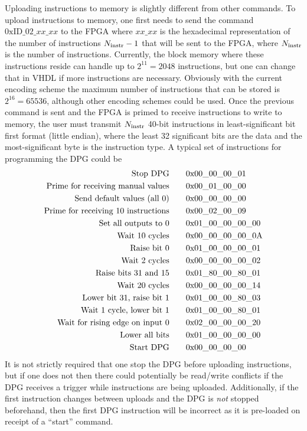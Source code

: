 \documentclass[]{article}
\begin{document}
Uploading instructions to memory is slightly different from other commands.  To upload instructions to memory, one first needs to send the command $0\mathrm{xID}\_02\_xx\_xx$ to the FPGA where $xx\_xx$ is the hexadecimal representation of the number of instructions $N_{\rm instr}-1$ that will be sent to the FPGA, where $N_{\rm instr}$ is the number of instructions.  Currently, the block memory where these instructions reside can handle up to $2^11=2048$ instructions, but one can change that in VHDL if more instructions are necessary.  Obviously with the current encoding scheme the maximum number of instructions that can be stored is $2^{16}=65536$, although other encoding schemes could be used.  Once the previous command is sent and the FPGA is primed to receive instructions to write to memory, the user must transmit $N_{\rm instr}$ 40-bit instructions in least-significant bit first format (little endian), where the least 32 significant bits are the data and the most-significant byte is the instruction type.  A typical set of instructions for programming the DPG could be
\begin{align}
\textrm{Stop DPG}\quad\quad&0\mathrm{x}00\_00\_00\_01\notag\\
\textrm{Prime for receiving manual values}\quad\quad&0\mathrm{x}00\_01\_00\_00\notag\\
\textrm{Send default values (all 0)}\quad\quad&0\mathrm{x}00\_00\_00\_00\notag\\
\textrm{Prime for receiving 10 instructions}\quad\quad&0\mathrm{x}00\_02\_00\_09\notag\\
\textrm{Set all outputs to 0}\quad\quad&0\mathrm{x}01\_00\_00\_00\_00\notag\\
\textrm{Wait 10 cycles}\quad\quad&0\mathrm{x}00\_00\_00\_00\_0\mathrm{A}\notag\\
\textrm{Raise bit 0}\quad\quad&0\mathrm{x}01\_00\_00\_00\_01\notag\\
\textrm{Wait 2 cycles}\quad\quad&0\mathrm{x}00\_00\_00\_00\_02\notag\\
\textrm{Raise bits 31 and 15}\quad\quad&0\mathrm{x}01\_80\_00\_80\_01\notag\\
\textrm{Wait 20 cycles}\quad\quad&0\mathrm{x}00\_00\_00\_00\_14\notag\\
\textrm{Lower bit 31, raise bit 1}\quad\quad&0\mathrm{x}01\_00\_00\_80\_03\notag\\
\textrm{Wait 1 cycle, lower bit 1}\quad\quad&0\mathrm{x}01\_00\_00\_80\_01\notag\\
\textrm{Wait for rising edge on input 0}\quad\quad&0\mathrm{x}02\_00\_00\_00\_20\notag\\
\textrm{Lower all bits}\quad\quad&0\mathrm{x}01\_00\_00\_00\_00\notag\\
\textrm{Start DPG}\quad\quad&0\mathrm{x}00\_00\_00\_00\notag
\end{align}
It is not strictly required that one stop the DPG before uploading instructions, but if one does not then there could potentially be read/write conflicts if the DPG receives a trigger while instructions are being uploaded.  Additionally, if the first instruction changes between uploads and the DPG is \emph{not} stopped beforehand, then the first DPG instruction will be incorrect as it is pre-loaded on receipt of a ``start'' command.
\end{document}
